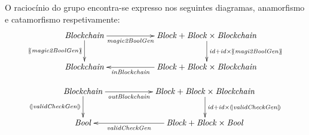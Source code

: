 \documentclass[a4paper]{article}
\newcommand{\Conid}[1]{\mathit{#1}}
\newcommand{\Varid}[1]{\mathit{#1}}
\def\ana#1{\mathopen{[\!(}#1\mathclose{)\!]}}
\begin{document}
\par O raciocínio do grupo encontra-se expresso nos seguintes diagramas, anamorfismo e catamorfismo respetivamente:  
\begin{eqnarray*}
\xymatrix@C=2cm{
    \ensuremath{\Conid{Blockchain}}
            \ar[d]_-{\ensuremath{\ana{\Varid{magic2BoolGen}}}}
            \ar[r]_-{\ensuremath{\Varid{magic2BoolGen}}}
&
    \ensuremath{\Conid{Block}\mathbin{+}\Conid{Block}\times\Conid{Blockchain}}
           \ar[d]^{\ensuremath{\Varid{id}\mathbin{+}\Varid{id}\times\ana{\Varid{magi2BoolGen}}}}
\\
     \ensuremath{\Conid{Blockchain}}
&
     \ensuremath{\Conid{Block}\mathbin{+}\Conid{Block}\times\Conid{Blockchain}}
           \ar[l]^-{\ensuremath{\Varid{inBlockchain}}}
}
\end{eqnarray*}

\begin{eqnarray*}
\xymatrix@C=2cm{
    \ensuremath{\Conid{Blockchain}}
           \ar[d]_-{\ensuremath{\cata{\Varid{validCheckGen}}}} 
           \ar[r]_-{\ensuremath{\Varid{outBlockchain}}}
&
    \ensuremath{\Conid{Block}\mathbin{+}\Conid{Block}\times\Conid{Blockchain}}
           \ar[d]^{\ensuremath{\Varid{id}\mathbin{+}\Varid{id}\times\cata{\Varid{validCheckGen}}}}
\\
     \ensuremath{\Conid{Bool}}
&
     \ensuremath{\Conid{Block}\mathbin{+}\Conid{Block}\times\Conid{Bool}}
           \ar[l]^-{\ensuremath{\Varid{validCheckGen}}}
}
\end{eqnarray*}
\end{document}
